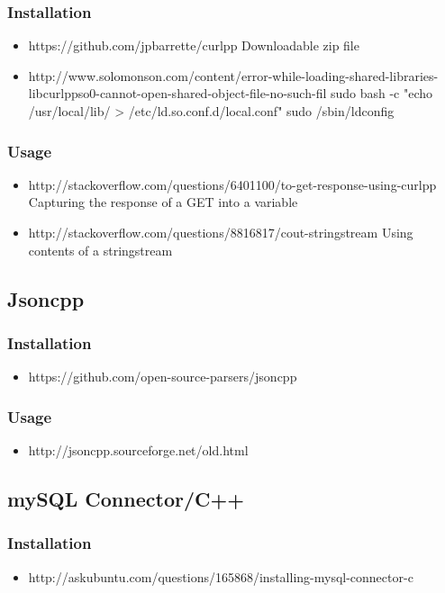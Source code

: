 \documentclass[12pt]{article}
\begin{document}
	\subsubsection{Installation}
	\begin{itemize}
		\item https://github.com/jpbarrette/curlpp
		\subitem Downloadable zip file
		\item http://www.solomonson.com/content/error-while-loading-shared-libraries-libcurlppso0-cannot-open-shared-object-file-no-such-fil
		\subitem sudo bash -c "echo /usr/local/lib/ > /etc/ld.so.conf.d/local.conf"
		\subitem sudo /sbin/ldconfig
		\end{itemize}
	\subsubsection{Usage}
		\begin{itemize}
			\item http://stackoverflow.com/questions/6401100/to-get-response-using-curlpp
			\subitem Capturing the response of a GET into a variable
			\item http://stackoverflow.com/questions/8816817/cout-stringstream
			\subitem Using contents of a stringstream
		\end{itemize}
	\subsection{Jsoncpp}
	\subsubsection{Installation}
		\begin{itemize}
			\item https://github.com/open-source-parsers/jsoncpp
		\end{itemize}
	\subsubsection{Usage}
		\begin{itemize}
			\item http://jsoncpp.sourceforge.net/old.html
		\end{itemize}
	\subsection{mySQL Connector/C++}
	\subsubsection{Installation}
		\begin{itemize}
			\item http://askubuntu.com/questions/165868/installing-mysql-connector-c
		\end{itemize}
\end{document}
